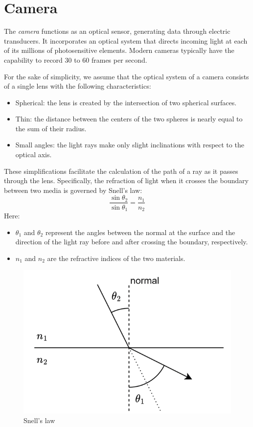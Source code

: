 \section{Camera}

\begin{definition}
The \emph{camera} functions as an optical sensor, generating data through electric transducers. 
It incorporates an optical system that directs incoming light at each of its millions of photosensitive elements. 
Modern cameras typically have the capability to record 30 to 60 frames per second.
\end{definition}
For the sake of simplicity, we assume that the optical system of a camera consists of a single lens with the following characteristics:
\begin{itemize}
    \item Spherical: the lens is created by the intersection of two spherical surfaces.
    \item Thin: the distance between the centers of the two spheres is nearly equal to the sum of their radius.
    \item Small angles: the light rays make only slight inclinations with respect to the optical axis.
\end{itemize}
These simplifications facilitate the calculation of the path of a ray as it passes through the lens.
Specifically, the refraction of light when it crosses the boundary between two media is governed by Snell's law:
\[\dfrac{\sin{\theta_2}}{\sin{\theta_1}}=\dfrac{n_1}{n_2}\]
Here: 
\begin{itemize}
    \item $\theta_1$ and $\theta_2$ represent the angles between the normal at the surface and the direction of the light ray before and after crossing the boundary, respectively.
    \item $n_1$ and $n_2$ are the refractive indices of the two materials.
\end{itemize}
\begin{figure}[H]
    \centering
    \includegraphics[width=0.4\linewidth]{images/refraction.png}
    \caption{Snell's law}
\end{figure}
